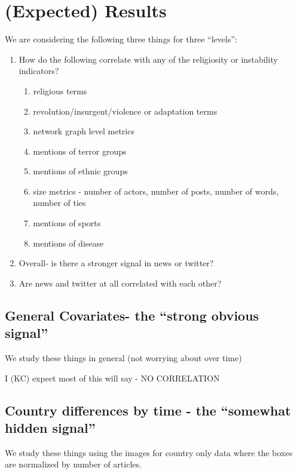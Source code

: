 
\section{(Expected) Results}

We are considering the following three things for three ``levels'':

\begin{enumerate}

\item How do the following correlate with any of the religiosity or instability indicators?
    \begin{enumerate}
        \item religious terms
        \item revolution/insurgent/violence or adaptation terms
        \item network graph level metrics
        \item mentions of terror groups
        \item mentions of ethnic groups
        \item size metrics - number of actors, number of posts,
        number of words, number of ties
        \item mentions of sports
        \item mentions of disease
    \end{enumerate}

\item Overall- is there a stronger signal in news or twitter?  

\item Are news and twitter at all correlated with each other?


\end{enumerate}


\subsection{General Covariates- the ``strong obvious signal''}

We study these things in general (not worrying about over time) 

I (KC) expect most of this will say - NO CORRELATION


\subsection{Country differences by time - the ``somewhat hidden signal''}

We study these things using the images for country only data where the boxes are normalized by number of articles.

